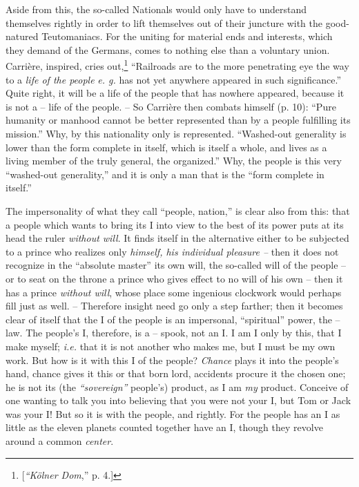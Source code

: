 \documentclass[12pt,a4paper]{book}
\begin{document}
Aside from this, the so-called Nationals would only have to understand 
themselves rightly in order to lift themselves out of their juncture with the 
good-natured Teutomaniacs. For the uniting for material ends and interests, 
which they demand of the Germans, comes to nothing else than a voluntary 
union. Carri\`ere, inspired, cries out,\footnote{[\textit{``K\"olner Dom},'' 
p. 4.]} ``Railroads are to the more penetrating eye the way to a \textit{life 
of the people} \textit{e. g.} has not yet anywhere appeared in such 
significance.'' Quite right, it will be a life of the people that has nowhere 
appeared, because it is not a -- life of the people. -- So Carri\`ere then 
combats himself (p. 10): ``Pure humanity or manhood cannot be better 
represented than by a people fulfilling its mission.'' Why, by this 
nationality only is represented. ``Washed-out generality is lower than the 
form complete in itself, which is itself a whole, and lives as a living member 
of the truly general, the organized.'' Why, the people is this very 
``washed-out generality,'' and it is only a man that is the ``form complete 
in itself.''

The impersonality of what they call ``people, nation,'' is clear also from 
this: that a people which wants to bring its I into view to the best of its 
power puts at its head the ruler \textit{without will}. It finds itself in the 
alternative either to be subjected to a prince who realizes only 
\textit{himself, his individual pleasure --} then it does not recognize in the 
``absolute master'' its own will, the so-called will of the people -- or to 
seat on the throne a prince who gives effect to no will of his own -- then it 
has a prince \textit{without will}, whose place some ingenious clockwork would 
perhaps fill just as well. -- Therefore insight need go only a step farther; 
then it becomes clear of itself that the I of the people is an impersonal, 
``spiritual'' power, the -- law. The people's I, therefore, is a -- spook, 
not an I. I am I only by this, that I make myself; \textit{i.e.} that it is 
not another who makes me, but I must be my own work. But how is it with this I 
of the people? \textit{Chance} plays it into the people's hand, chance gives 
it this or that born lord, accidents procure it the chosen one; he is not its 
(the \textit{``sovereign''} people's) product, as I am \textit{my} product. 
Conceive of one wanting to talk you into believing that you were not your I, 
but Tom or Jack was your I! But so it is with the people, and rightly. For the 
people has an I as little as the eleven planets counted together have an I, 
though they revolve around a common \textit{center}.
\end{document}
